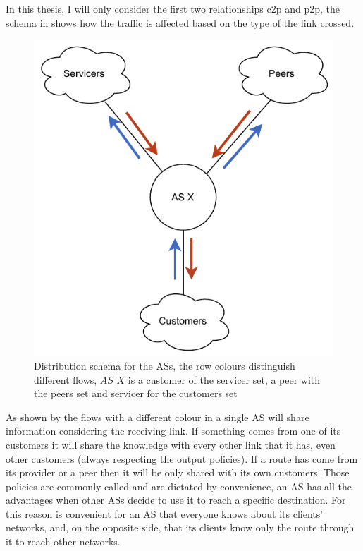 In this thesis, I will only consider the first two relationships \ac{c2p} and
\ac{p2p}, the schema in  shows how the traffic is affected
based on the type of the link crossed.

\begin{figure}[ht]
    \centering
    \includegraphics[scale=0.75]{images/BGP/ASKnowledgeDistribution.pdf}
	\caption{Distribution schema for the \acp{AS}, the row colours distinguish
	different flows, $AS\_X$ is a customer of the servicer set, a peer with the
	peers set and servicer for the customers set}
    \label{fig:AS_flow}
\end{figure}


As shown by the flows with a different colour in  a single
\ac{AS} will share information considering the receiving link.
If something comes from one of its customers it will share the knowledge with
every other link that it has, even other customers (always respecting the output policies).
If a route has come from its provider or a peer then it will be only shared with
its own customers.
Those policies are commonly called  and are dictated by convenience,
an \ac{AS} has all the advantages when
other \acp{AS} decide to use it to reach a specific destination.
For this reason is convenient for an \ac{AS} that everyone knows about its clients'
networks, and, on the opposite side, that its clients know only the route
through it to reach other networks.


